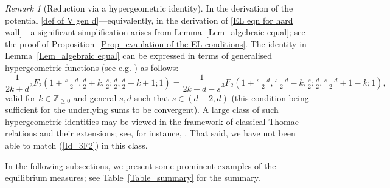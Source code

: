 \documentclass[10pt]{amsart}
\theoremstyle{plain}
\theoremstyle{remark}
\newtheorem{rem}{Remark}
\numberwithin{equation}{section}
\begin{document}
\begin{rem}[Reduction via a hypergeometric identity]
In the derivation of the potential \eqref{def of V gen d}---equivalently, in the derivation of \eqref{EL eqn for hard wall}---a significant simplification arises from Lemma~\ref{Lem_algebraic equal}; see the proof of  Proposition~\ref{Prop_evaulation of the EL conditions}. 
The identity in Lemma~\ref{Lem_algebraic equal} can be expressed in terms of generalised hypergeometric functions (see e.g. \cite[Chapter~16]{NIST}) as follows:
\begin{equation} \label{Id_3F2}
 \frac{ 1 }{ 2k+d  }  {}_3F_2(  1+\tfrac{s-d}{2}, \tfrac{d}{2}+k, \tfrac{s}{2};  \tfrac{d}{2}, \tfrac{d}{2}+k+1; 1  ) = \frac{ 1 }{  2k+ d-s   }  {}_3F_2( 1+\tfrac{s-d}{2}, \tfrac{s-d}{2}-k, \tfrac{s}{2};  \tfrac{d}{2}, \tfrac{s-d}{2}+1-k; 1  ),
\end{equation}
valid for $k \in \mathbb Z_{\ge 0}$ and general $s,d$ such that $s \in (d-2,d) $ (this condition being sufficient for the underlying sums to be convergent). A large class of such hypergeometric identities may be viewed in the framework of classical Thomae relations and their extensions; see, for instance, \cite{KR06,KR03}. That said, we have not been able to match (\ref{Id_3F2}) in this class.
\end{rem}


















In the following subsections, we present some prominent examples of the equilibrium measures; see Table~\ref{Table_summary} for the summary. 
\end{document}
